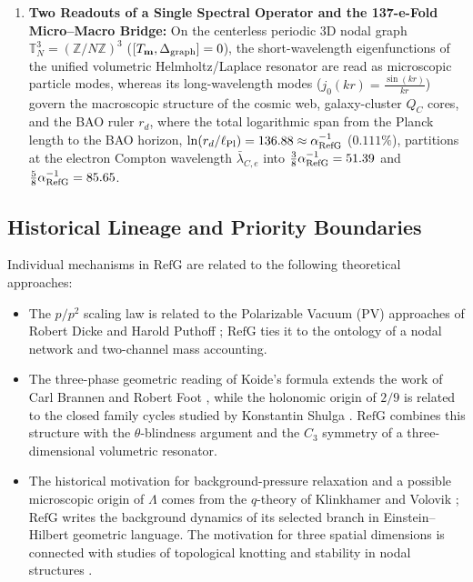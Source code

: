 \documentclass[11pt,a4paper]{article}
\newcommand{\RefG}{\mathrm{RefG}}
\begin{document}
\begin{enumerate}[label=\arabic*.]
\item \textbf{Two Readouts of a Single Spectral Operator and the 137-e-Fold Micro--Macro Bridge:} On the centerless periodic 3D nodal graph $\mathbb{T}^3_N = (\mathbb{Z}/N\mathbb{Z})^3$ ($[T_{\mathbf{m}}, \Delta_{\rm graph}] = 0$), the short-wavelength eigenfunctions of the unified volumetric Helmholtz/Laplace resonator are read as microscopic particle modes, whereas its long-wavelength modes ($j_0(kr) = \frac{\sin(kr)}{kr}$) govern the macroscopic structure of the cosmic web, galaxy-cluster $Q_C$ cores, and the BAO ruler $r_d$, where the total logarithmic span from the Planck length to the BAO horizon, $\ln(r_d/\ell_{\rm Pl}) = 136.88 \approx \alpha_{\rm RefG}^{-1}$ ($0.111\%$), partitions at the electron Compton wavelength $\bar{\lambda}_{C,e}$ into $\frac{3}{8}\alpha_{\rm RefG}^{-1} = 51.39$ and $\frac{5}{8}\alpha_{\rm RefG}^{-1} = 85.65$.
\end{enumerate}

\subsection*{Historical Lineage and Priority Boundaries}

Individual mechanisms in $\RefG$ are related to the following theoretical approaches:
\begin{itemize}
\item The $p/p^2$ scaling law is related to the Polarizable Vacuum (PV) approaches of Robert Dicke and Harold Puthoff \citep{dicke1957,puthoff2002}; $\RefG$ ties it to the ontology of a nodal network and two-channel mass accounting.
\item The three-phase geometric reading of Koide's formula extends the work of Carl Brannen and Robert Foot \citep{brannen2010,foot1994}, while the holonomic origin of $2/9$ is related to the closed family cycles studied by Konstantin Shulga \citep{shulga2026}. $\RefG$ combines this structure with the $\theta$-blindness argument and the $C_3$ symmetry of a three-dimensional volumetric resonator.
\item The historical motivation for background-pressure relaxation and a possible microscopic origin of $\Lambda$ comes from the $q$-theory of Klinkhamer and Volovik \citep{klinkhamer2008}; $\RefG$ writes the background dynamics of its selected branch in Einstein--Hilbert geometric language. The motivation for three spatial dimensions is connected with studies of topological knotting and stability in nodal structures \citep{whitrow1955,berera2017}.
\end{itemize}
\end{document}
